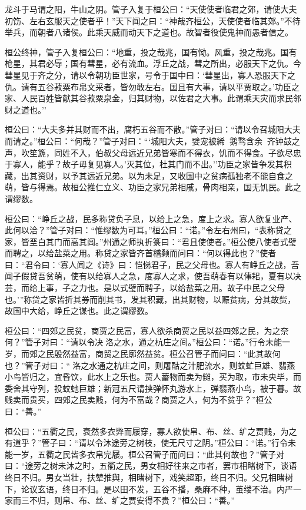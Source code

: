 \documentclass[]{article}
\begin{document}
龙斗于马谓之阳，牛山之阴。管子入复于桓公曰：``天使使者临君之郊，请使大夫初饬、左右玄服天之使者乎！''天下闻之曰：``神哉齐桓公，天使使者临其郊。''不待举兵，而朝者八诸侯。此乘天威而动天下之道也。故智者役使鬼神而愚者信之。

桓公终神，管子入复桓公曰：``地重，投之哉兆，国有恸。风重，投之哉兆。国有枪星，其君必辱；国有彗星，必有流血。浮丘之战，彗之所出，必服天下之仇。今彗星见于齐之分，请以令朝功臣世家，号令于国中曰：`彗星出，寡人恐服天下之仇。请有五谷菽粟布帛文采者，皆勿敢左右。国且有大事，请以平贾取之。'功臣之家、人民百姓皆献其谷菽粟泉金，归其财物，以佐君之大事。此谓乘天灾而求民邻财之道也。''

桓公曰：``大夫多并其财而不出，腐朽五谷而不散。''管子对曰：``请以令召城阳大夫而请之。''桓公曰：``何哉？''管子对曰：```城阳大夫，嬖宠被絺，鹅骛含余，齐钟鼓之声，吹笙篪，同姓不入，伯叔父母远近兄弟皆寒而不得衣，饥而不得食。子欲尽忠于寡人，能乎？故子毋复见寡人。'灭其位，杜其门而不出。''功臣之家皆争发其积藏，出其资财，以予其远近兄弟。以为未足，又收国中之贫病孤独老不能自食之萌，皆与得焉。故桓公推仁立义、功臣之家兄弟相戚，骨肉相亲，国无饥民。此之谓缪数。

桓公曰：``峥丘之战，民多称贷负子息，以给上之急，度上之求。寡人欲复业产、此何以洽？''管子对曰：``惟缪数为可耳。''桓公曰：``诺。''令左右州曰，``表称贷之家，皆垩白其门而高其闾。''州通之师执折箓曰：``君且使使者。''桓公使八使者式璧而聘之，以给盐菜之用。称贷之家皆齐首稽颡而问曰：``何以得此也？''使者曰：``君令曰：`寡人闻之《诗》曰：恺悌君子，民之父母也。寡人有峥丘之战，吾闻子假贷吾贫萌，使有以给寡人之急，度寡人之求，使吾萌春有以倳耜，夏有以决芸，而给上事，子之力也。是以式璧而聘子，以给盐菜之用。故子中民之父母也。'''称贷之家皆折其券而削其书，发其积藏，出其财物，以赈贫病，分其故赀，故国中大给，峥丘之谋也。此之谓缪数。

桓公曰：``四郊之民贫，商贾之民富，寡人欲杀商贾之民以益四郊之民，为之奈何？''管子对曰：``请以令决洛之水，通之杭庄之间。''桓公曰：``诺。''行令未能一岁，而郊之民殷然益富，商贸之民廓然益贫。桓公召管子而问曰：``此其故何也？''管子对曰：``洛之水通之杭庄之间，则屠酤之汁肥流水，则蚊虻巨雄、翡燕小鸟皆归之，宜昏饮，此水上之乐也。贾人蓄物而卖为雠，买为取，市未央毕，而委舍其守列，投蚊虵巨雄；新冠五尺请挟弹怀丸游水上，弹翡燕小鸟，被于暮。故贱卖而贵买，四郊之民卖贱，何为不富哉？商贾之人，何为不贫乎？''桓公曰：``善。''

桓公曰：``五衢之民，衰然多衣弊而屦穿，寡人欲使帛、布、丝、纩之贾贱，为之有道乎？''管子曰：``请以令沐途旁之树枝，使无尺寸之阴。''桓公曰：``诺。''行令未能一岁，五衢之民皆多衣帛完屦。桓公召管子而问曰：``此其何故也？''管子对曰：``途旁之树未沐之时，五衢之民，男女相好往来之市者，罢市相睹树下，谈语终日不归。男女当壮，扶辇推舆，相睹树下，戏笑超距，终日不归。父兄相睹树下，论议玄语，终日不归。是以田不发，五谷不播，桑麻不种，茧缕不治。内严一家而三不归，则帛、布、丝、纩之贾安得不贵？''桓公曰：``善。''
\end{document}
